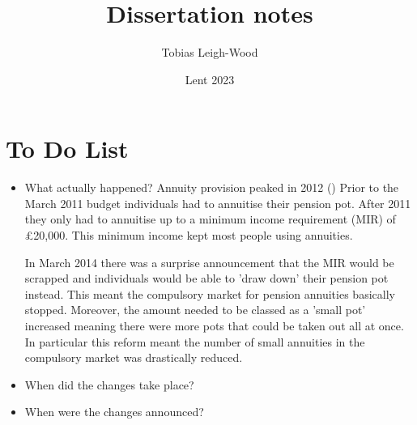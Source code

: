 \documentclass[12pt]{article}
\date{Lent 2023}
\title{Dissertation notes}
\author{Tobias Leigh-Wood}
\begin{document}
\maketitle

\section*{To Do List}
\begin{itemize}
    \item What actually happened?
          Annuity provision peaked in 2012 (\cite{cannon_effect_2016}) Prior to the March 2011 budget individuals had to annuitise their pension pot.
          After 2011 they only had to annuitise up to a minimum income requirement (MIR) of £20,000. This minimum income kept most people using annuities.

          In March 2014 there was a surprise announcement that the MIR would be scrapped and individuals would be able to 'draw down' their pension pot instead.
          This meant the compulsory market for pension annuities basically stopped. Moreover, the amount needed to be classed as a 'small pot' increased meaning there were more pots that could be taken out all at once.
          In particular this reform meant the number of small annuities in the compulsory market was drastically reduced.


    \item When did the changes take place?
    \item When were the changes announced?
\end{itemize}




\end{document}
